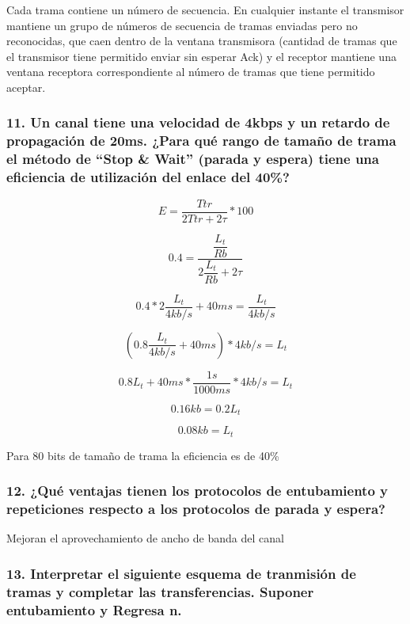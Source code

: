 \documentclass{article}
\begin{document}
Cada trama contiene un número de secuencia. En cualquier instante el
transmisor mantiene un grupo de números de secuencia de tramas enviadas
pero no reconocidas, que caen dentro de la ventana transmisora (cantidad
de tramas que el transmisor tiene permitido enviar sin esperar Ack) y el
receptor mantiene una ventana receptora correspondiente al número de
tramas que tiene permitido aceptar.

\subsubsection{\texorpdfstring{11. Un canal tiene una velocidad de 4kbps
y un retardo de propagación de 20ms. ¿Para qué rango de tamaño de trama
el método de ``Stop \& Wait'' (parada y espera) tiene una eficiencia de
utilización del enlace del
40\%?}{11. Un canal tiene una velocidad de 4kbps y un retardo de propagación de 20ms. ¿Para qué rango de tamaño de trama el método de Stop \& Wait (parada y espera) tiene una eficiencia de utilización del enlace del 40\%?}}\label{un-canal-tiene-una-velocidad-de-4kbps-y-un-retardo-de-propagaciuxf3n-de-20ms.-para-quuxe9-rango-de-tamauxf1o-de-trama-el-muxe9todo-de-stop-wait-parada-y-espera-tiene-una-eficiencia-de-utilizaciuxf3n-del-enlace-del-40}

\[ E = \dfrac{Ttr}{2Ttr + 2\tau} * 100 \]

\[ 0.4 = \dfrac{\dfrac{L_t}{Rb}}{2\dfrac{L_t}{Rb} + 2\tau} \]

\[ 0.4 * 2\dfrac{L_t}{4kb/s} + 40ms = \dfrac{L_t}{4kb/s} \]

\[ (0.8 \dfrac{L_t}{4kb/s} + 40ms) * 4kb/s = L_t \]

\[ 0.8 L_t + 40ms * \dfrac{1s}{1000ms} * 4kb/s = L_t \]

\[ 0.16kb = 0.2L_t \]

\[ 0.08kb = L_t \]

Para 80 bits de tamaño de trama la eficiencia es de 40\%

\subsubsection{12. ¿Qué ventajas tienen los protocolos de entubamiento y
repeticiones respecto a los protocolos de parada y
espera?}\label{quuxe9-ventajas-tienen-los-protocolos-de-entubamiento-y-repeticiones-respecto-a-los-protocolos-de-parada-y-espera}

Mejoran el aprovechamiento de ancho de banda del canal

\subsubsection{13. Interpretar el siguiente esquema de tranmisión de
tramas y completar las transferencias. Suponer entubamiento y Regresa
n.}\label{interpretar-el-siguiente-esquema-de-tranmisiuxf3n-de-tramas-y-completar-las-transferencias.-suponer-entubamiento-y-regresa-n.}
\end{document}
